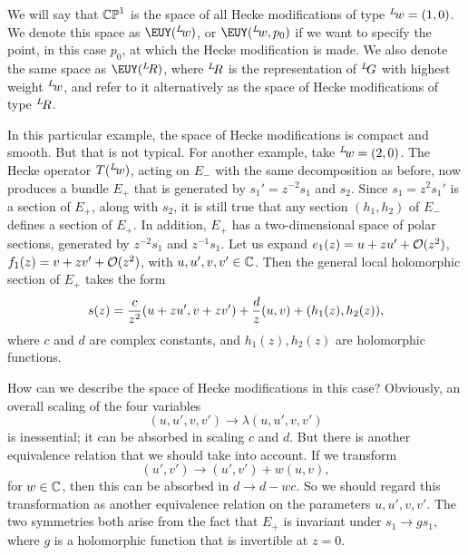 We will say that $\Bbb{CP}^1$ is the space of all Hecke
modifications of type $^L\negthinspace w=(1,0)$. We denote this
space as ${{\EUY}}(^L\negthinspace w)$, or
${{\EUY}}(^L\negthinspace w,p_0)$ if we want to specify the point,
in this case $p_0$, at which the Hecke modification is made.  We
also denote the same space as ${{\EUY}}(^L\negthinspace R)$, where
$^L\negthinspace R$ is the representation of $^L\negthinspace G$
with highest weight $^L\negthinspace w$, and refer to it
alternatively as the space of Hecke modifications of type
$^L\negthinspace R$.

In this particular example, the space of Hecke modifications is
compact and smooth.  But that is not typical.  For another
example, take $^L\negthinspace w=(2,0)$.  The Hecke operator
$T(^L\negthinspace w)$, acting on $E_-$ with the same
decomposition as before, now produces a bundle $E_+$ that is
generated by $s_1'=z^{-2}s_1$ and $s_2$. Since $s_1=z^2s_1'$ is a
section of $E_+$, along with $s_2$, it is still true that any
section $(h_1,h_2)$ of $E_-$ defines a section of $E_+$.  In
addition, $E_+$ has a two-dimensional space of polar sections,
generated by $z^{-2}s_1$ and $z^{-1}s_1$.  Let us expand
$e_1(z)=u+zu'+{\cal O}(z^2)$, $f_1(z)=v+zv'+{\cal O}(z^2)$, with
$u,u',v,v'\in\Bbb{C}$. Then the general local holomorphic section
of $E_+$ takes the form %
\setcounter{equation}{16}
\begin{equation}\label{eq:ilko}
s(z)={c\over
z^2}(u+zu',v+zv')+{d\over z} (u,v)+(h_1(z),h_2(z)),
\end{equation}
 where $c$ and
$d$ are complex constants, and $h_1(z),h_2(z)$ are holomorphic
functions.

How can we describe the space of Hecke modifications in this case?
Obviously, an overall scaling of the four variables
\setcounter{equation}{17}
\begin{equation}\label{eq:lorky}
(u,u',v,v')\to\lambda (u,u',v,v')
\end{equation}
 is inessential; it
can be absorbed in scaling $c$ and $d$.  But there is another
equivalence relation that we should take into account. If we
transform %
\setcounter{equation}{18}
\begin{equation}\label{eq:morky}
(u',v')\to (u', v')+w(u,v),
\end{equation}
 for  $w\in
\Bbb{C}$, then this can be absorbed in $d\to d-wc$. So we should
regard this transformation as another equivalence relation on the
parameters $u,u',v,v'$.  The two symmetries both arise from the
fact that $E_+$ is invariant under $s_1\to gs_1$, where $g$ is a
holomorphic function that is invertible at $z=0$.

